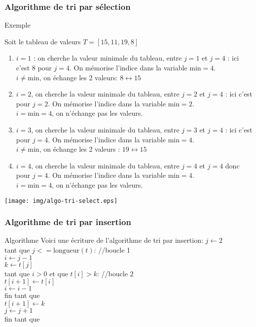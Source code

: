 \documentclass[9pt]{beamer}
\newcommand{\esp}{\hspace{0.5cm}}
\newcommand{\espp}{\hspace{1cm}}
\newcounter{num}
\begin{document}
\begin{frame}
\frametitle{Algorithme de tri par sélection}

\begin{exampleblock}{Exemple}
\begin{minipage}{8.4cm}
Soit le tableau de valeurs $T=[15,11,19,8]$
\begin{enumerate}
\item $i=1$ : on cherche la valeur minimale du tableau, entre $j=1$ et $j=4$ : ici c'est 8 pour $j=4$. On mémorise l'indice dans la variable $\text{min}=4$.\\
$i \neq \text{min}$, on échange les 2 valeurs: $8 \longleftrightarrow 15$
\item $i=2$, on cherche la valeur minimale du tableau, entre $j=2$ et $j=4$ : ici c'est pour $j=2$. On mémorise l'indice dans la variable $\text{min}=2$.\\
$i = \text{min} = 4$, on n'échange pas les valeurs.
\item $i=3$, on cherche la valeur minimale du tableau, entre $j=3$ et $j=4$ : ici c'est pour $j=4$. On mémorise l'indice dans la variable $\text{min}=4$.\\
$i \neq \text{min}$, on échange les 2 valeurs : $19 \longleftrightarrow 15$
\item $i=4$, on cherche la valeur minimale du tableau, entre $j=4$ et $j=4$ donc pour $j=4$. On mémorise l'indice dans la variable $\text{min}=4$.\\
$i = \text{min} = 4$, on n'échange pas les valeurs.
\end{enumerate}
\end{minipage}\hfill
\begin{minipage}{3.4cm}
\texttt{[image: img/algo-tri-select.eps]}
\end{minipage}
\end{exampleblock}
\end{frame}

\begin{frame}
\frametitle{Algorithme de tri par insertion}

\begin{block}{Algorithme}
Voici une écriture de l'algorithme de tri par insertion:\medskip
$j \longleftarrow 2$\\
tant que $j <= \text{longueur}(t)$:   //boucle 1\\
\esp $i \longleftarrow j-1$\\
\esp $k \longleftarrow t[j]$\\
\esp tant que $i>0$ et que $t[i]>k$:   //boucle 2\\
\espp $t[i+1] \longleftarrow t[i]$\\
\espp $i \longleftarrow i-1$\\
\esp fin tant que\\
\esp $t[i+1] \longleftarrow k$\\
\esp $j \longleftarrow j+1$\\
fin tant que
\end{block}

\end{frame}
\end{document}
